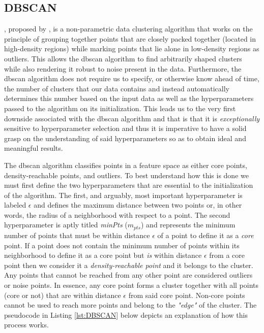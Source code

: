 \subsection{DBSCAN}
\label{subsec:Background-Information:Clustering-Algorithms:DBSCAN}
, proposed by \citet{Ester}, is a non-parametric data clustering algorithm that works on the principle of grouping together points that are closely packed together (\ie located in high-density regions) while marking points that lie alone in low-density regions as outliers. This allows the \gls{dbscan} algorithm to find arbitrarily shaped clusters while also rendering it robust to noise present in the data. Furthermore, the \gls{dbscan} algorithm does not require us to specify, or otherwise know ahead of time, the number of clusters that our data contains and instead automatically determines this number based on the input data as well as the hyperparameters passed to the algorithm on its initialization. This leads us to the very first downside associated with the \gls{dbscan} algorithm and that is that it is \textit{exceptionally} sensitive to hyperparameter selection and thus it is imperative to have a solid grasp on the understanding of said hyperparameters so as to obtain ideal and meaningful results.

\noindent \newline The \gls{dbscan} algorithm classifies points in a feature space as either core points, density-reachable points, and outliers. To best understand how this is done we must first define the two hyperparameters that are essential to the initialization of the algorithm. The first, and arguably, most important hyperparameter is labeled $\epsilon$ and defines the maximum distance between two points or, in other words, the radius of a neighborhood with respect to a point. The second hyperparameter is aptly titled \textit{minPts} ($m_{pts}$) and represents the minimum number of points that must be within distance $\epsilon$ of a point to define it as a \textit{core} point. If a point does not contain the minimum number of points within its neighborhood to define it as a core point but \textit{is} within distance $\epsilon$ from a core point then we consider it a \textit{density-reachable point} and it belongs to the cluster. Any points that cannot be reached from any other point are considered outliers or noise points. In essence, any core point forms a cluster together with all points (core or not) that are within distance $\epsilon$ from said core point. Non-core points cannot be used to reach more points and belong to the \textit{"edge"} of the cluster. The pseudocode in Listing \ref{lst:DBSCAN} below depicts an explanation of how this process works.

